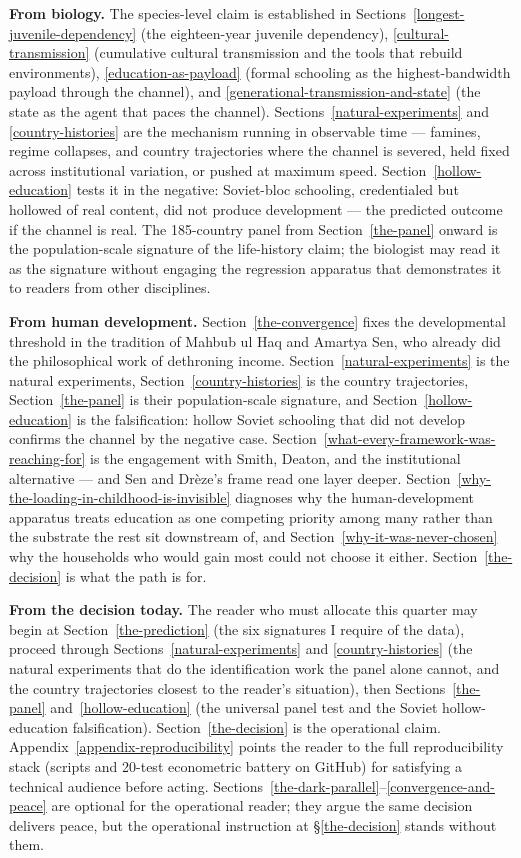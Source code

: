 \documentclass[12pt,letterpaper]{article}
\begin{document}
\textbf{From biology.} The species-level claim is established in
Sections~\ref{longest-juvenile-dependency} (the eighteen-year juvenile
dependency), \ref{cultural-transmission} (cumulative cultural
transmission and the tools that rebuild environments),
\ref{education-as-payload} (formal schooling as the highest-bandwidth
payload through the channel), and \ref{generational-transmission-and-state} (the state as the
agent that paces the channel).
Sections~\ref{natural-experiments} and \ref{country-histories} are
the mechanism running in observable time --- famines, regime
collapses, and country trajectories where the channel is severed,
held fixed across institutional variation, or pushed at maximum
speed. Section~\ref{hollow-education} tests it in the negative:
Soviet-bloc schooling, credentialed but hollowed of real content,
did not produce development --- the predicted outcome if the channel
is real. The 185-country panel from Section~\ref{the-panel}
onward is the population-scale signature of the life-history claim;
the biologist may read it as the signature without engaging the
regression apparatus that demonstrates it to readers from other
disciplines.

\textbf{From human development.} Section~\ref{the-convergence} fixes
the developmental threshold in the tradition of Mahbub ul Haq and Amartya Sen, who
already did the philosophical work of dethroning income.
Section~\ref{natural-experiments} is the natural experiments,
Section~\ref{country-histories} is the country trajectories,
Section~\ref{the-panel} is their population-scale signature, and
Section~\ref{hollow-education} is the falsification: hollow Soviet
schooling that did not develop confirms the channel by the negative case.
Section~\ref{what-every-framework-was-reaching-for} is the engagement with
Smith, Deaton, and the institutional alternative --- and Sen and Drèze's
frame read one layer deeper.
Section~\ref{why-the-loading-in-childhood-is-invisible} diagnoses why
the human-development apparatus treats education as one competing
priority among many rather than the substrate the rest sit downstream
of, and Section~\ref{why-it-was-never-chosen} why the households
who would gain most could not choose it either.
Section~\ref{the-decision} is what the path is for.

\textbf{From the decision today.} The reader who must allocate this
quarter may begin at Section~\ref{the-prediction} (the six
signatures I require of the data), proceed through
Sections~\ref{natural-experiments} and \ref{country-histories} (the
natural experiments that do the identification work the panel alone
cannot, and the country trajectories closest to the reader's
situation), then Sections~\ref{the-panel} and~\ref{hollow-education}
(the universal panel test and the Soviet hollow-education
falsification). Section~\ref{the-decision} is the operational
claim. Appendix~\ref{appendix-reproducibility} points the reader to the
full reproducibility stack (scripts and 20-test econometric battery
on GitHub) for satisfying a technical audience before acting.
Sections~\ref{the-dark-parallel}--\ref{convergence-and-peace} are
optional for the operational reader; they argue the same decision
delivers peace, but the operational instruction at
\S\ref{the-decision} stands without them.
\end{document}

